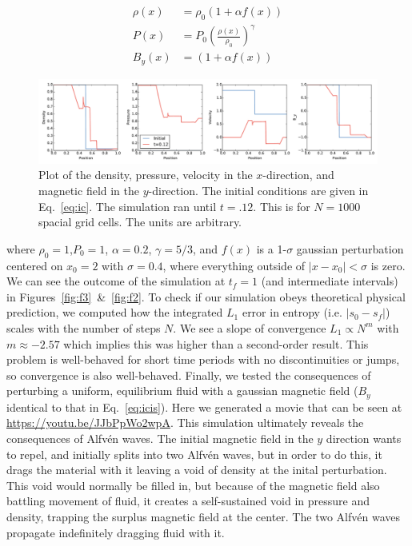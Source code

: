 \documentclass[iop,twocolumn]{emulateapj}
\begin{document}
\begin{align}
  \rho(x)&=\rho_0(1+\alpha f(x))\nonumber\\
  P(x)&=P_0\left(\frac{\rho(x)}{\rho_0}\right)^\gamma\nonumber\\
  B_y(x)&=(1+\alpha f(x))\label{eq:icis}
\end{align}
\begin{figure}[htb!]
\includegraphics[scale=.45,trim=0cm 0cm 0cm 0cm,clip]{f1.pdf}
\caption{Plot of the density, pressure, velocity in the $x$-direction, and magnetic field in the $y$-direction. The initial conditions are given in Eq.~\ref{eq:ic}. The simulation ran until $t=.12$. This is for $N=1000$ spacial grid cells. The units are arbitrary. \label{fig:f1}}
\end{figure}
where $\rho_0=1$,$P_0=1$, $\alpha=0.2$, $\gamma=5/3$, and $f(x)$ is a 1-$\sigma$ gaussian perturbation centered on $x_0=2$ with $\sigma=0.4$, where everything outside of $|x-x_0|<\sigma$ is zero. We can see the outcome of the simulation at $t_f=1$ (and intermediate intervals) in Figures~\ref{fig:f3}~\&~\ref{fig:f2}. To check if our simulation obeys theoretical physical prediction, we computed how the integrated $L_1$ error in entropy (i.e. $|s_0-s_f|$) scales with the number of steps $N$. We see a slope of convergence $L_1\propto N^m$ with $m\approx-2.57$ which implies this was higher than a second-order result. This problem is well-behaved for short time periods with no discontinuities or jumps, so convergence is also well-behaved. Finally, we tested the consequences of perturbing a uniform, equilibrium fluid with a gaussian magnetic field ($B_y$ identical to that in Eq.~\ref{eq:icis}). Here we generated a movie that can be seen at \url{https://youtu.be/JJbPpWo2wpA}. This simulation ultimately reveals the consequences of Alfv{\'e}n waves. The initial magnetic field in the $y$ direction wants to repel, and initially splits into two Alfv{\'e}n waves, but in order to do this, it drags the material with it leaving a void of density at the inital perturbation. This void would normally be filled in, but because of the magnetic field also battling movement of fluid, it creates a self-sustained void in pressure and density, trapping the surplus magnetic field at the center. The two Alfv{\'e}n waves propagate indefinitely dragging fluid with it.
\end{document}
